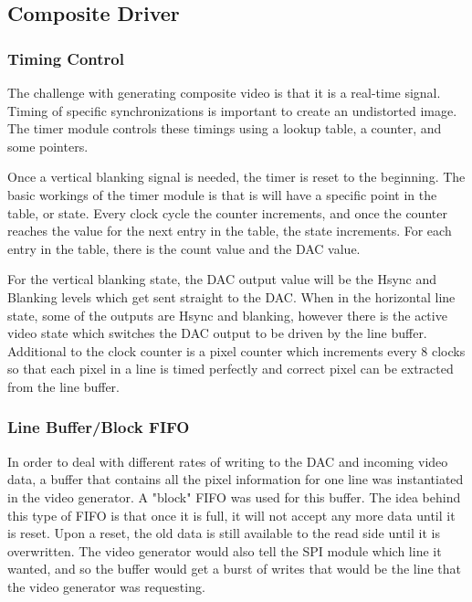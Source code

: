 \subsection{Composite Driver}

\subsubsection{Timing Control}

The challenge with generating composite video is that it is a real-time signal.
Timing of specific synchronizations is important to create an undistorted image.
The timer module controls these timings using a lookup table, a counter, and
some pointers.

Once a vertical blanking signal is needed, the timer is reset to the beginning.
The basic workings of the timer module is that is will have a specific point in
the table, or state. Every clock cycle the counter increments, and once the
counter reaches the value for the next entry in the table, the state increments.
For each entry in the table, there is the count value and the DAC value. 

For the vertical blanking state, the DAC output value will be the Hsync and
Blanking levels which get sent straight to the DAC. When in the horizontal line
state, some of the outputs are Hsync and blanking, however there is the active
video state which switches the DAC output to be driven by the line buffer.
Additional to the clock counter is a pixel counter which increments every 8
clocks so that each pixel in a line is timed perfectly and correct pixel can be
extracted from the line buffer.

\subsubsection{Line Buffer/Block FIFO}

In order to deal with different rates of writing to the DAC and incoming video
data, a buffer that contains all the pixel information for one line was
instantiated in the video generator. A "block" FIFO was used for this buffer.
The idea behind this type of FIFO is that once it is full, it will not accept
any more data until it is reset. Upon a reset, the old data is still available
to the read side until it is overwritten. The video generator would also tell
the SPI module which line it wanted, and so the buffer would get a burst of
writes that would be the line that the video generator was requesting.

